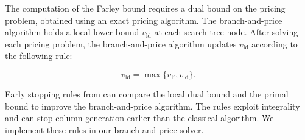 The computation of the Farley bound requires a dual bound on the pricing problem, obtained using an exact pricing algorithm. The branch-and-price algorithm holds a local lower bound $v_{\mathrm{ld}}$ at each search tree node. After solving each pricing problem, the branch-and-price algorithm updates $v_{\mathrm{ld}}$ according to the following rule:

\begin{equation*}
 \label{eq.update}
 v_{\mathrm{ld}} = \max \{ v_{\mathrm{F}}, v_{\mathrm{ld}}\}.
\end{equation*}

Early stopping rules from \cite{wei2020new}  can compare the local dual bound and the primal bound to improve the branch-and-price algorithm. The rules exploit  integrality and can  stop column generation earlier than the classical algorithm.  We implement these rules in our branch-and-price solver.
 
\begin{comment}
Since the RMLP is a restriction of the master LP, it follows that

\begin{equation*}
 v_{\mathrm{ld}} \le v_{\mathrm{MP}}\le v_{\mathrm{RMLP}}.
\end{equation*}

When $v_{\mathrm{price}}$ converges to 1, $v_{\mathrm{ld}}$ converges to $v_{\mathrm{MP}}$.

\textbf{Early stopping} Stopping early terminates column generation using the local dual bound and the global primal bound \citep{wei2020new} originally used for linear BP. We also apply this rule in our implementation.

At each node of the search tree, the rules for early termination follow as follows:

\begin{enumerate}

 

 \item If $ v_{\mathrm{ld}} \le v_{\mathrm{RMLP}} < \left \lceil{v_{\mathrm{ld}}}\right \rceil $, then $v_{\mathrm{MP}} < \left \lceil{v_{\mathrm{ld}}}\right \rceil $ and hence $\left \lceil v_{\mathrm{MP}} \right \rceil = \left \lceil{v_{\mathrm{ld}}}\right \rceil$, the branch-and-price algorithm terminates the column generation procedure with the local dual bound $v_{\mathrm{ld}}$.

\end{enumerate}

\end{comment}



